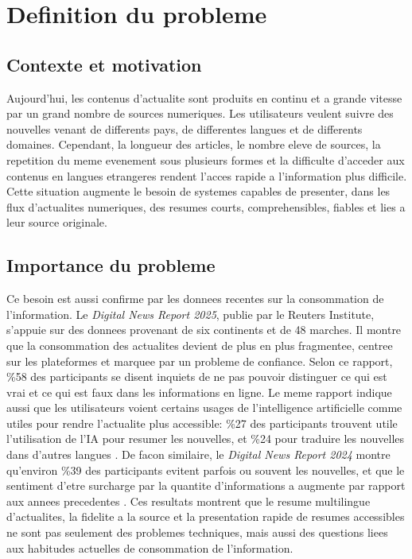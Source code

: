\section{Definition du probleme}

\subsection{Contexte et motivation}

Aujourd'hui, les contenus d'actualite sont produits en continu et a grande vitesse par un grand nombre de sources numeriques. Les utilisateurs veulent suivre des nouvelles venant de differents pays, de differentes langues et de differents domaines. Cependant, la longueur des articles, le nombre eleve de sources, la repetition du meme evenement sous plusieurs formes et la difficulte d'acceder aux contenus en langues etrangeres rendent l'acces rapide a l'information plus difficile. Cette situation augmente le besoin de systemes capables de presenter, dans les flux d'actualites numeriques, des resumes courts, comprehensibles, fiables et lies a leur source originale.

\subsection{Importance du probleme}

Ce besoin est aussi confirme par les donnees recentes sur la consommation de l'information. Le \textit{Digital News Report 2025}, publie par le Reuters Institute, s'appuie sur des donnees provenant de six continents et de 48 marches. Il montre que la consommation des actualites devient de plus en plus fragmentee, centree sur les plateformes et marquee par un probleme de confiance. Selon ce rapport, \%58 des participants se disent inquiets de ne pas pouvoir distinguer ce qui est vrai et ce qui est faux dans les informations en ligne. Le meme rapport indique aussi que les utilisateurs voient certains usages de l'intelligence artificielle comme utiles pour rendre l'actualite plus accessible: \%27 des participants trouvent utile l'utilisation de l'IA pour resumer les nouvelles, et \%24 pour traduire les nouvelles dans d'autres langues \cite{Newman2025DNR}. De facon similaire, le \textit{Digital News Report 2024} montre qu'environ \%39 des participants evitent parfois ou souvent les nouvelles, et que le sentiment d'etre surcharge par la quantite d'informations a augmente par rapport aux annees precedentes \cite{Newman2024DNR}. Ces resultats montrent que le resume multilingue d'actualites, la fidelite a la source et la presentation rapide de resumes accessibles ne sont pas seulement des problemes techniques, mais aussi des questions liees aux habitudes actuelles de consommation de l'information.

